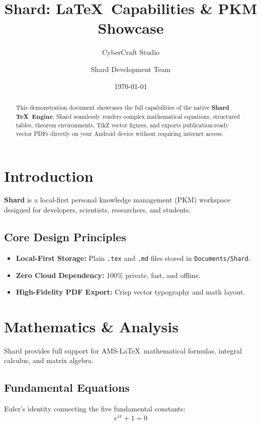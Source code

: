 \documentclass[11pt, a4paper]{article}
\title{\textbf{Shard: \LaTeX\ Capabilities \& PKM Showcase}}
\author{CyberCraft Studio \and Shard Development Team}
\date{\today}
\begin{document}
\maketitle

\begin{abstract}
This demonstration document showcases the full capabilities of the native \textbf{Shard \TeX\ Engine}. Shard seamlessly renders complex mathematical equations, structured tables, theorem environments, TikZ vector figures, and exports publication-ready vector PDFs directly on your Android device without requiring internet access.
\end{abstract}

\tableofcontents

\newpage

\section{Introduction}
\label{sec:intro}

\textbf{Shard} is a local-first personal knowledge management (PKM) workspace designed for developers, scientists, researchers, and students.

\subsection{Core Design Principles}
\begin{itemize}
    \item \textbf{Local-First Storage:} Plain \texttt{.tex} and \texttt{.md} files stored in \texttt{Documents/Shard}.
    \item \textbf{Zero Cloud Dependency:} 100\% private, fast, and offline.
    \item \textbf{High-Fidelity PDF Export:} Crisp vector typography and math layout.
\end{itemize}

\section{Mathematics \& Analysis}
\label{sec:math}

Shard provides full support for AMS-\LaTeX\ mathematical formulas, integral calculus, and matrix algebra.

\subsection{Fundamental Equations}
Euler's identity connecting the five fundamental constants:
\begin{equation}
\label{eq:euler}
e^{i\pi} + 1 = 0
\end{equation}
\end{document}
